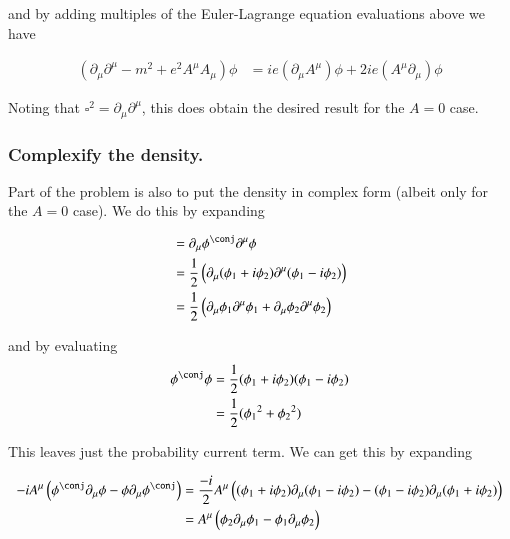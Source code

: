 \documentclass{article}
\begin{document}
and by adding multiples of the Euler-Lagrange equation evaluations above we have

\begin{align}\label{eqn:complexifiedSolution}
\left( \partial_\mu \partial^\mu -m^2 + e^2 A^\mu A_\mu \right) \phi &= i e (\partial_\mu A^\mu) \phi + 2 i e (A^\mu \partial_\mu) \phi 
\end{align}

Noting that $\square^2 = \partial_\mu \partial^\mu$, this does obtain the desired result for the $A=0$ case.

\subsubsection{ Complexify the density. }

Part of the problem is also to put the density in complex form (albeit only for the $A=0$ case).  We do this by expanding

\begin{align*}
&= \partial_\mu \phi^\conj \partial^\mu \phi \\
&=
\inv{2} \left( \partial_\mu (\phi_1 + i \phi_2) \partial^\mu (\phi_1 - i \phi_2) \right) \\
&=
\inv{2} \left( \partial_\mu \phi_1 \partial^\mu \phi_1 + \partial_\mu \phi_2 \partial^\mu \phi_2 \right) \\
\end{align*}

and by evaluating
\begin{align*}
\phi^\conj \phi 
&= \inv{2} (\phi_1 + i \phi_2) (\phi_1 - i \phi_2) \\
&= \inv{2} ({\phi_1}^2 + {\phi_2}^2 )
\end{align*}

This leaves just the probability current term.  We can get this by expanding

\begin{align*}
- i A^\mu \left( \phi^\conj \partial_\mu \phi - \phi \partial_\mu \phi^\conj \right)
&=
\frac{-i}{2} A^\mu \left( (\phi_1 + i \phi_2) \partial_\mu (\phi_1 - i \phi_2) - (\phi_1 - i \phi_2) \partial_\mu (\phi_1 + i \phi_2) \right) \\
&=
A^\mu \left( \phi_2 \partial_\mu \phi_1 - \phi_1 \partial_\mu \phi_2 \right)
\end{align*}

\end{document}
